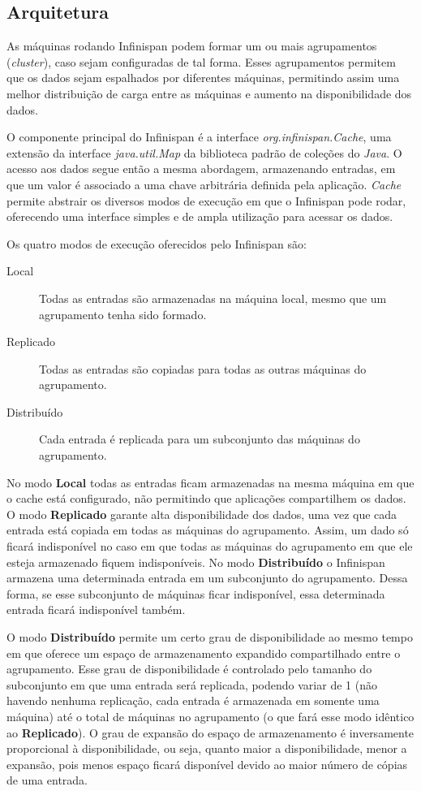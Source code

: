 \documentclass[11pt,twoside,a4paper]{book}
\begin{document}
\subsection{Arquitetura}
\label{sec:arquitetura_infinispan}
As máquinas rodando Infinispan podem formar um ou mais agrupamentos (\emph{cluster}), caso sejam configuradas de tal forma. Esses agrupamentos permitem que os dados sejam espalhados por diferentes máquinas, permitindo assim uma melhor distribuição de carga entre as máquinas e aumento na disponibilidade dos dados.

O componente principal do Infinispan é a interface \emph{org.infinispan.Cache}, uma extensão da interface \emph{java.util.Map} da biblioteca padrão de coleções do \emph{Java}. O acesso aos dados segue então a mesma abordagem, armazenando entradas, em que um valor é associado a uma chave arbitrária definida pela aplicação. \emph{Cache} permite abstrair os diversos modos de execução em que o Infinispan pode rodar, oferecendo uma interface simples e de ampla utilização para acessar os dados.

Os quatro modos de execução oferecidos pelo Infinispan são:

\begin{description}
	\item[Local] Todas as entradas são armazenadas na máquina local, mesmo que um agrupamento tenha sido formado.
	\item[Replicado] Todas as entradas são copiadas para todas as outras máquinas do agrupamento.
	\item[Distribuído] Cada entrada é replicada para um subconjunto das máquinas do agrupamento.
\end{description}

No modo \textbf{Local} todas as entradas ficam armazenadas na mesma máquina em que o cache está configurado, não permitindo que aplicações compartilhem os dados. O modo \textbf{Replicado} garante alta disponibilidade dos dados, uma vez que cada entrada está copiada em todas as máquinas do agrupamento. Assim, um dado só ficará indisponível no caso em que todas as máquinas do agrupamento em que ele esteja armazenado fiquem indisponíveis. No modo \textbf{Distribuído} o Infinispan armazena uma determinada entrada em um subconjunto do agrupamento. Dessa forma, se esse subconjunto de máquinas ficar indisponível, essa determinada entrada ficará indisponível também. 

O modo \textbf{Distribuído} permite um certo grau de disponibilidade ao mesmo tempo em que oferece um espaço de armazenamento expandido compartilhado entre o agrupamento. Esse grau de disponibilidade é controlado pelo tamanho do subconjunto em que uma entrada será replicada, podendo variar de 1 (não havendo nenhuma replicação, cada entrada é armazenada em somente uma máquina) até o total de máquinas no agrupamento (o que fará esse modo idêntico ao \textbf{Replicado}). O grau de expansão do espaço de armazenamento é inversamente proporcional à disponibilidade, ou seja, quanto maior a disponibilidade, menor a expansão, pois menos espaço ficará disponível devido ao maior número de cópias de uma entrada.
\end{document}
